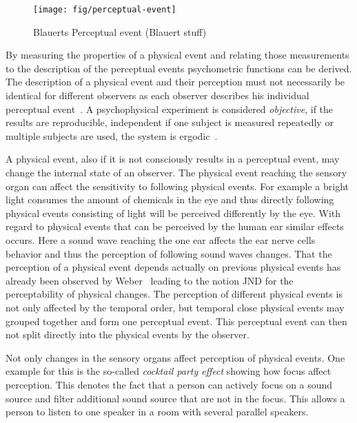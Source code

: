 \begin{figure}
	\texttt{[image: fig/perceptual-event]}
	\caption{Blauerts Perceptual event (Blauert stuff)}	
	\label{img:chap02:auditory-event}
\end{figure}

By measuring the properties of a physical event and relating those measurements to the description of the perceptual events psychometric functions can be derived.
The description of a physical event and their perception must not necessarily be identical for different observers as each observer describes his individual perceptual event~\cite[p. 11]{blauert_spatial_1996}.
A psychophysical experiment is considered \emph{objective}, if the results are reproducible, independent if one subject is measured repeatedly or multiple subjects are used, \ie the system is ergodic~\cite[p. 11]{blauert_spatial_1996}.

A physical event, also if it is not consciously results in a perceptual event, may change the internal state of an observer.
The physical event reaching the sensory organ can affect the sensitivity to following physical events.
For example a bright light consumes the amount of chemicals in the eye and thus directly following physical events consisting of light will be perceived differently by the eye.
With regard to physical events that can be perceived by the human ear similar effects occurs.
Here a sound wave reaching the one ear affects the ear nerve cells behavior and thus the perception of following sound waves changes. %
That the perception of a physical event depends actually on previous physical events has already been observed by Weber~\cite{Weber-Fechner} leading to the notion \ac{JND} for the perceptability of physical changes.
The perception of different physical events is not only affected by the temporal order, but temporal close physical events may grouped together and form one perceptual event.%
This perceptual event can then not split directly into the physical events by the observer.

Not only changes in the sensory organs affect perception of physical events.
One example for this is the so-called \emph{cocktail party effect} showing how focus affect perception.
This denotes the fact that a person can actively focus on a sound source and filter additional sound source that are not in the focus.
This allows a person to listen to one speaker in a room with several parallel speakers.

